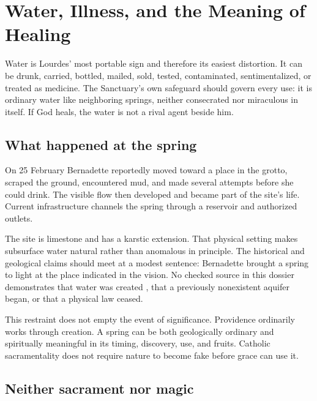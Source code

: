 \section{Water, Illness, and the Meaning of Healing}

Water is Lourdes' most portable sign and therefore its easiest distortion. It can be drunk, carried, bottled, mailed, sold, tested, contaminated, sentimentalized, or treated as medicine. The Sanctuary's own safeguard should govern every use: it is ordinary water like neighboring springs, neither consecrated nor miraculous in itself. If God heals, the water is not a rival agent beside him.

\subsection{What happened at the spring}

On 25 February Bernadette reportedly moved toward a place in the grotto, scraped the ground, encountered mud, and made several attempts before she could drink. The visible flow then developed and became part of the site's life. Current infrastructure channels the spring through a reservoir and authorized outlets.

The site is limestone and has a karstic extension. That physical setting makes subsurface water natural rather than anomalous in principle. The historical and geological claims should meet at a modest sentence: Bernadette brought a spring to light at the place indicated in the vision. No checked source in this dossier demonstrates that water was created , that a previously nonexistent aquifer began, or that a physical law ceased.

This restraint does not empty the event of significance. Providence ordinarily works through creation. A spring can be both geologically ordinary and spiritually meaningful in its timing, discovery, use, and fruits. Catholic sacramentality does not require nature to become fake before grace can use it.


\subsection{Neither sacrament nor magic}


